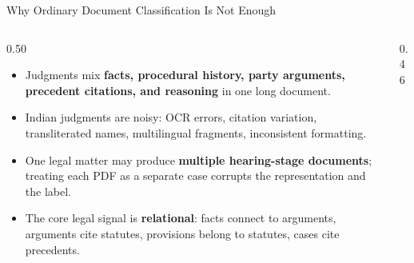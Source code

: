 \documentclass[aspectratio=169,11pt]{beamer}
\newenvironment{tightitemize}{
  \begin{itemize}
    \setlength{\itemsep}{2pt}
    \setlength{\parskip}{0pt}
}{\end{itemize}}
\newcommand{\highlight}[1]{\textcolor{ThesisBlue}{\textbf{#1}}}
\begin{document}
\begin{frame}{Why Ordinary Document Classification Is Not Enough}
  \small
  \begin{columns}[T]
    \begin{column}{0.50\textwidth}
      \begin{tightitemize}
        \item Judgments mix \highlight{facts, procedural history, party arguments, precedent citations, and reasoning} in one long document.
        \item Indian judgments are noisy: OCR errors, citation variation, transliterated names, multilingual fragments, inconsistent formatting.
        \item One legal matter may produce \highlight{multiple hearing-stage documents}; treating each PDF as a separate case corrupts the representation and the label.
        \item The core legal signal is \highlight{relational}: facts connect to arguments, arguments cite statutes, provisions belong to statutes, cases cite precedents.
      \end{tightitemize}
    \end{column}
    \begin{column}{0.46\textwidth}
      \centering
    \end{column}
  \end{columns}
\end{frame}
\end{document}
